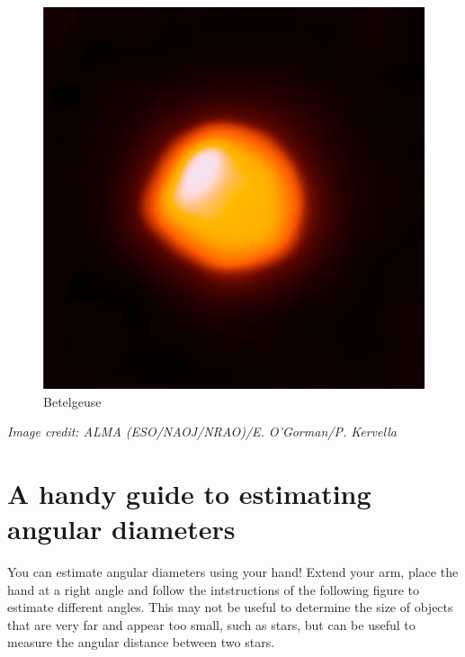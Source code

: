 \documentclass[
  letterpaper,
  DIV=11,
  numbers=noendperiod]{scrreprt}
\begin{document}
\begin{figure}

{\centering \includegraphics{img/Betelgeuse.png}

}

\caption{Betelgeuse}

\end{figure}

\emph{Image credit: ALMA (ESO/NAOJ/NRAO)/E. O'Gorman/P. Kervella}

\hypertarget{a-handy-guide-to-estimating-angular-diameters}{%
\section{A handy guide to estimating angular
diameters}\label{a-handy-guide-to-estimating-angular-diameters}}

You can estimate angular diameters using your hand! Extend your arm,
place the hand at a right angle and follow the intstructions of the
following figure to estimate different angles. This may not be useful to
determine the size of objects that are very far and appear too small,
such as stars, but can be useful to measure the angular distance between
two stars.
\end{document}
